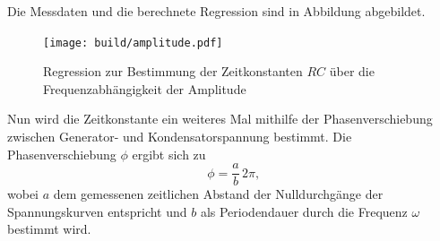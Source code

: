Die Messdaten und die berechnete Regression sind in Abbildung  abgebildet.
\begin{figure}
	\centering
	\texttt{[image: build/amplitude.pdf]}
	\caption{Regression zur Bestimmung der Zeitkonstanten $RC$ über die Frequenzabhängigkeit der Amplitude}
	\label{fig:plotb}
\end{figure}

Nun wird die Zeitkonstante ein weiteres Mal mithilfe der Phasenverschiebung zwischen Generator- und Kondensatorspannung bestimmt.
Die Phasenverschiebung $\phi$ ergibt sich zu
\begin{equation*}
	\phi = \frac{a}{b} \, 2\pi \text{,}
\end{equation*}
wobei $a$ dem gemessenen zeitlichen Abstand der Nulldurchgänge der Spannungskurven entspricht und $b$ als Periodendauer durch die Frequenz $\omega$ bestimmt wird.

